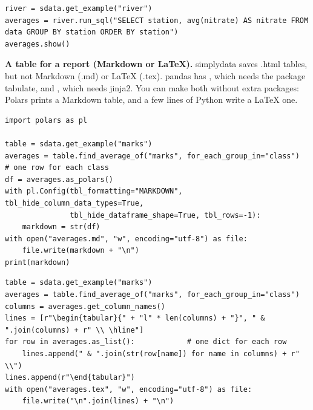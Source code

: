 \begin{lstlisting}[style=py]
river = sdata.get_example("river")
averages = river.run_sql("SELECT station, avg(nitrate) AS nitrate FROM data GROUP BY station ORDER BY station")
averages.show()
\end{lstlisting}

\textbf{A table for a report (Markdown or LaTeX).} simplydata saves .html tables, but not Markdown
(.md) or LaTeX (.tex). pandas has , which needs the package tabulate, and
, which needs jinja2. You can make both without extra packages: Polars prints a
Markdown table, and a few lines of Python write a LaTeX one.

\begin{lstlisting}[style=py]
import polars as pl

table = sdata.get_example("marks")
averages = table.find_average_of("marks", for_each_group_in="class")    # one row for each class
df = averages.as_polars()
with pl.Config(tbl_formatting="MARKDOWN", tbl_hide_column_data_types=True,
               tbl_hide_dataframe_shape=True, tbl_rows=-1):
    markdown = str(df)
with open("averages.md", "w", encoding="utf-8") as file:
    file.write(markdown + "\n")
print(markdown)
\end{lstlisting}

\begin{lstlisting}[style=py]
table = sdata.get_example("marks")
averages = table.find_average_of("marks", for_each_group_in="class")
columns = averages.get_column_names()
lines = [r"\begin{tabular}{" + "l" * len(columns) + "}", " & ".join(columns) + r" \\ \hline"]
for row in averages.as_list():            # one dict for each row
    lines.append(" & ".join(str(row[name]) for name in columns) + r" \\")
lines.append(r"\end{tabular}")
with open("averages.tex", "w", encoding="utf-8") as file:
    file.write("\n".join(lines) + "\n")
\end{lstlisting}

